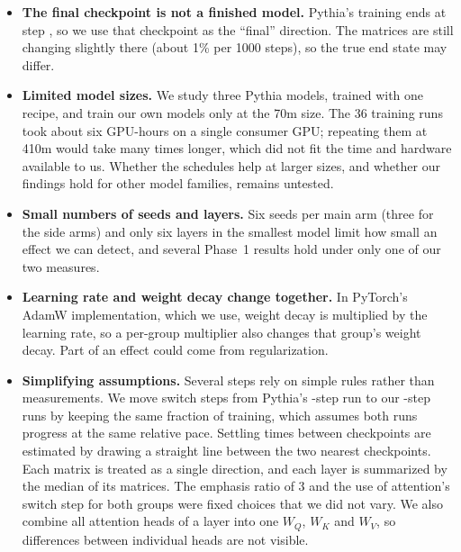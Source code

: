 \documentclass[11pt]{article}
\newcommand{\Wq}{W_Q}
\newcommand{\Wk}{W_K}
\newcommand{\Wv}{W_V}
\begin{document}
\begin{itemize}\itemsep0pt \parskip0pt
  
\item \textbf{The final checkpoint is not a finished model.} Pythia's training
  ends at step \FinalStep{}, so we use that checkpoint as the ``final''
  direction. The matrices are still changing slightly there (about 1\% per
  1000 steps), so the true end state may differ.
  
\item \textbf{Limited model sizes.} We study three Pythia models, trained with
  one recipe, and train our own models only at the 70m size. The 36 training
  runs took about six GPU-hours on a single consumer GPU; repeating them at
  410m would take many times longer, which did not fit the time and hardware
  available to us. Whether the schedules help at larger sizes, and whether
  our findings hold for other model families, remains untested.
  

\item \textbf{Small numbers of seeds and layers.} Six seeds per main arm (three
  for the side arms) and only six layers in the smallest model limit how
  small an effect we can detect, and several Phase~1 results hold under only
  one of our two measures.
  
\item \textbf{Learning rate and weight decay change together.} In PyTorch's
  AdamW implementation, which we use, weight decay is multiplied by the
  learning rate, so a per-group multiplier also changes that group's weight
  decay. Part of an
  effect could come from regularization.

\item \textbf{Simplifying assumptions.} Several steps rely on simple rules
  rather than measurements. We move switch steps from Pythia's
  \FinalStep{}-step run to our \PhaseTwoSteps{}-step runs by keeping the same
  fraction of training, which assumes both runs progress at the same relative
  pace. Settling times between checkpoints are estimated by drawing a straight
  line between the two nearest checkpoints. Each matrix is treated as a single
  direction, and each layer is summarized by the median of its matrices. The
  emphasis ratio of 3 and the use of attention's switch step for both groups
  were fixed choices that we did not vary.
  We also combine all attention heads of a layer into one $\Wq$, $\Wk$ and
$\Wv$, so differences between individual heads are not visible.
  

\end{itemize}
\end{document}
